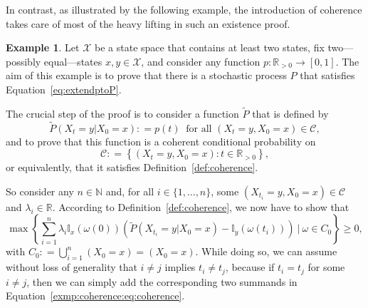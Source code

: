 \documentclass[10pt,a4paper]{paper}
\theoremstyle{definition}
\newtheorem{exmp}{Example}%
\newcommand{\nats}{\mathbb{N}}
\newcommand{\reals}{\mathbb{R}}
\newcommand{\realspos}{\reals_{>0}}
\newcommand{\states}{\mathcal{X}}
\newcommand{\ind}[1]{\mathbb{I}_{#1}}
\newcommand{\coloneqq}{:\!=}
\begin{document}
In contrast, as illustrated by the following example, the introduction of coherence takes care of most of the heavy lifting in such an existence proof.
\begin{exmp}\label{exmp:coherence_constructs_process}
Let $\states$ be a state space that contains at least two states, fix two---possibly equal---states $x,y\in\states$, and consider any function $p:\realspos\to[0,1]$. The aim of this example is to prove that there is a stochastic process $P$ that satisfies Equation~\eqref{eq:extendptoP}.

The crucial step of the proof is to consider a function $\tilde{P}$ that is defined by
\begin{equation}\label{exmp:coherence:eq:probdef}
\tilde{P}(X_t=y\vert X_0=x) \coloneqq p(t)
~\text{ for all $(X_t=y,X_0=x)\in\mathcal{C}$},
\end{equation}
and to prove that this function is a coherent conditional probability on
\begin{equation*}
\mathcal{C} \coloneqq \left\{ (X_t=y,X_0=x)\colon t\in\realspos \right\},
\end{equation*}
or equivalently, that it satisfies Definition~\ref{def:coherence}.

So consider any $n\in\nats$ and, for all $i\in\{1,\ldots,n\}$, some $(X_{t_i}=y,X_0=x)\in\mathcal{C}$ and $\lambda_i\in\reals$. According to Definition~\ref{def:coherence}, we now have to show that
\begin{equation}\label{exmp:coherence:eq:coherence}
\max\left\{ \sum_{i=1}^n \lambda_i\ind{x}(\omega(0))\left(\tilde{P}(X_{t_i}=y\vert X_0=x) - \ind{y}(\omega(t_i))\right)~\Bigg\vert~ \omega\in C_0 \right\} \geq 0,
\end{equation}
with $C_0\coloneqq \bigcup_{i=1}^n (X_0=x)=(X_0=x)$. 
While doing so, we can assume without loss of generality that $i\neq j$ implies $t_i\neq t_j$, because if $t_i=t_j$ for some $i\neq j$, then we can simply add the corresponding two summands in Equation~\eqref{exmp:coherence:eq:coherence}.


\end{exmp}
\end{document}
